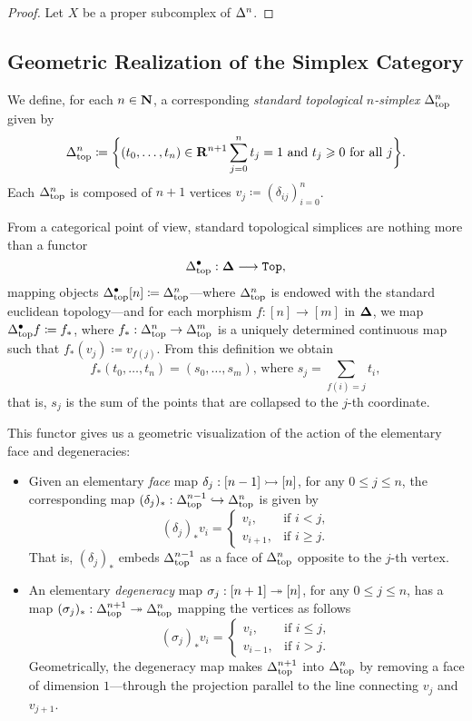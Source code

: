 \begin{proof}
Let \(X\) be a proper subcomplex of \(\Delta^n\).
\end{proof}

\subsection{Geometric Realization of the Simplex Category}

We define, for each \(n \in \mathbf{N}\), a corresponding \emph{standard topological
  \(n\)-simplex} \(\Delta_{\text{top}}^n\) given by
\[
\Delta_{\text{top}}^n \coloneq \bigg\{(t_0, \dots, t_n) \in \mathbf{R}^{n+1} \relax \sum_{j=0}^n
t_j = 1 \text{ and } t_j \geqslant 0 \text{ for all } j \bigg\}.
\]
Each \(\Delta_{\text{top}}^n\) is composed of \(n+1\) vertices
\(v_j \coloneq (\delta_{ij})_{i=0}^n\).

From a categorical point of view, standard topological simplices are nothing
more than a functor
\[
\Delta_{\text{top}}^{\bullet}: {\mathbf{\Delta}} \longrightarrow {\texttt{Top}},
\]
mapping objects \(\Delta_{\text{top}}^{\bullet}[n] \coloneq \Delta_{\text{top}}^n\)---where
\(\Delta_{\text{top}}^n\) is endowed with the standard euclidean topology---and for each
morphism \(f: [n] \to [m]\) in \({\mathbf{\Delta}}\), we map
\(\Delta_{\text{top}}^{\bullet} f \coloneq f_{*}\), where
\(f_{*}: \Delta_{\text{top}}^n \to \Delta_{\text{top}}^m\) is a uniquely determined continuous map
such that \(f_{*}(v_j) \coloneq v_{f(j)}\). From this definition we obtain
\[
f_{*}(t_0, \dots, t_n) = (s_0, \dots, s_m) \text{,\ \ where \ }
s_j = \sum_{f(i) = j} t_i,
\]
that is, \(s_j\) is the sum of the points that are collapsed to the \(j\)-th
coordinate.

This functor gives us a geometric visualization of the action of the elementary
face and degeneracies:
\begin{itemize}\setlength\itemsep{0em}
\item Given an elementary \emph{face} map \(\delta_j: [n-1] \rightarrowtail [n]\), for any
  \(0 \leq j \leq n\), the corresponding map
  \((\delta_j)_{*}: \Delta_{\text{top}}^{n-1} \hookrightarrow \Delta_{\text{top}}^n\) is given by
  \[
  (\delta_j)_{*} v_i =
  \begin{cases}
    v_i, &\text{if } i < j, \\
    v_{i+1}, &\text{if } i \geq j.
  \end{cases}
  \]
  That is, \((\delta_j)_{*}\) embeds \(\Delta_{\text{top}}^{n-1}\) as a face of
  \(\Delta_{\text{top}}^n\) opposite to the \(j\)-th vertex.

\item An elementary \emph{degeneracy} map \(\sigma_j: [n+1] \twoheadrightarrow [n]\), for any
  \(0 \leq j \leq n\), has a map
  \((\sigma_j)_{*}: \Delta_{\text{top}}^{n+1} \twoheadrightarrow \Delta_{\text{top}}^n\) mapping the vertices as
  follows
  \[
  (\sigma_j)_{*} v_i =
  \begin{cases}
    v_i, &\text{if } i \leq j, \\
    v_{i-1}, &\text{if } i > j.
  \end{cases}
  \]
  Geometrically, the degeneracy map makes \(\Delta_{\text{top}}^{n+1}\) into \(\Delta_{\text{top}}^n\)
  by removing a face of dimension \(1\)---through the projection parallel to the
  line connecting \(v_j\) and \(v_{j+1}\).
\end{itemize}

